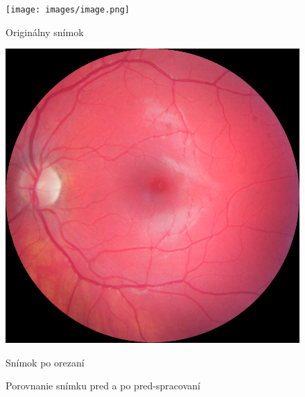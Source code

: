 \documentclass[a4paper, 11pt]{article}
\begin{document}
\begin{figure}[h]
\centering
\begin{minipage}{0.48\textwidth}
  \centering
  \texttt{[image: images/image.png]}
  \caption{Originálny snímok}
  \label{fig:first-image}
\end{minipage}\hfill
\begin{minipage}{0.48\textwidth}
  \centering
  \includegraphics[width=\linewidth]{images/0011L1.png}
  \caption{Snímok po orezaní}
  \label{fig:second-image}
\end{minipage}
\caption{Porovnanie snímku pred a po pred-spracovaní}
\label{fig:two-images}
\end{figure}


\vspace{20px}
\end{document}
